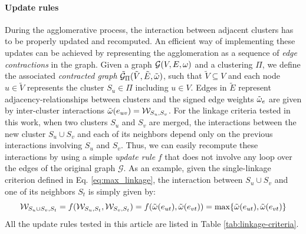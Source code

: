 \begin{minipage}{\textwidth}
\begin{minipage}{0.49\textwidth}
    \end{minipage}
\end{minipage}

\paragraph{Update rules} During the agglomerative process, the interaction between adjacent clusters has to be properly updated and recomputed.  %
An efficient way of implementing these updates can be achieved by representing the agglomeration as a sequence of \emph{edge contractions} in the graph. Given a graph $\mathcal{G}(V,E,\omega)$ and a clustering $\Pi$, we define the associated \emph{contracted graph} $\tilde{\mathcal{G}}_\Pi(\tilde{V}, \tilde{E}, \tilde{\omega})$, such that $\tilde{V} \subseteq V$ and each node $u\in \tilde{V}$ represents the cluster $S_u \in \Pi$ including $u\in V$. Edges in $\tilde{E}$ represent adjacency-relationships between clusters and the signed edge weights $\tilde{\omega}_e$ are given by inter-cluster interactions $\tilde{\omega}(e_{uv})=\mathcal{W}_{S_u,S_v}$. 
For the linkage criteria tested in this work, when two clusters $S_u$ and $S_v$ are merged, the interactions between the new cluster $S_u \cup S_v$ and each of its neighbors depend only on the previous interactions involving $S_u$ and $S_v$. Thus, we can easily recompute these interactions by using a simple \emph{update rule} $f$ that does not involve any loop over the edges of the original graph $\mathcal{G}$. As an example, given the single-linkage criterion defined in Eq. \ref{eq:max_linkage}, the interaction between $S_u \cup S_v$ and one of its neighbors $S_t$ is simply given by:
\begin{equation}
  \mathcal{W}_{S_u \cup S_v,S_t} = f( \mathcal{W}_{S_u,S_t}, \mathcal{W}_{S_v,S_t}) = f(\tilde{\omega}(e_{ut}), \tilde{\omega}(e_{vt})) = \max \{ \tilde{\omega}(e_{ut}), \tilde{\omega}(e_{vt}) \}
\end{equation}
All the update rules tested in this article are listed in Table \ref{tab:linkage-criteria}.
